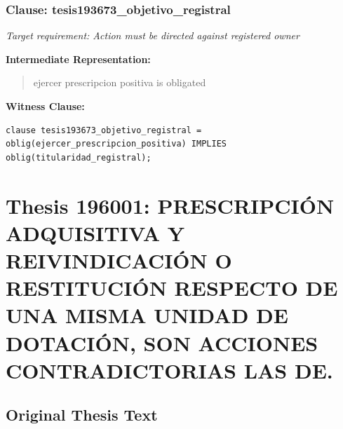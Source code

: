 \documentclass[11pt,a4paper]{article}
\begin{document}
\subsubsection{Clause: tesis193673\_objetivo\_registral}

\textit{Target requirement: Action must be directed against registered owner}

\textbf{Intermediate Representation:}

\begin{quote}
ejercer prescripcion positiva is obligated
\end{quote}

\textbf{Witness Clause:}

\begin{lstlisting}[style=witnessstyle, language=Witness]
clause tesis193673_objetivo_registral = oblig(ejercer_prescripcion_positiva) IMPLIES oblig(titularidad_registral);
\end{lstlisting}

\newpage

\section{Thesis 196001: PRESCRIPCIÓN ADQUISITIVA Y REIVINDICACIÓN O RESTITUCIÓN RESPECTO DE UNA MISMA UNIDAD DE DOTACIÓN, SON ACCIONES CONTRADICTORIAS LAS DE.}
\label{thesis:196001}

\subsection{Original Thesis Text}
\end{document}
